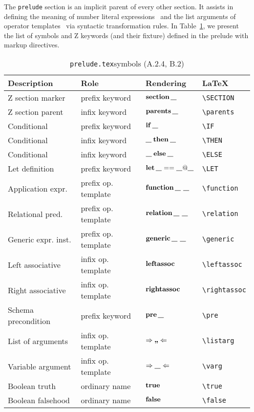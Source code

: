 \documentclass{article}
\newcommand{\emfile}[1]{\texttt{#1}}%
\newcommand{\preludefile}{\emfile{prelude.tex}}
\newcommand{\smallcaption}[1]{{\small (#1)}}
\begin{document}
The \texttt{prelude} section is an implicit parent of every other section.
It assists in defining the meaning of number literal expressions~\cite[12.2.6.9]{isoz}
and the list arguments of operator templates~\cite[12.2.12]{isoz} via syntactic transformation
rules. In Table~\ref{tbl:symbol-toolkit-prelude}, we present the list of symbols
and Z keywords (and their fixture) defined in the prelude with markup directives.
%
\begin{table}[ht]
\centering
\begin{tabular}{|l|l|l|l|}
   \hline
   \textbf{Description} & \textbf{Role} & \textbf{Rendering} & \textbf{\LaTeX} \\
   \hline
   Z section marker     & prefix keyword      & $\SECTION\varg$                 & \verb|\SECTION| \\
   \hline
   Z section parent     & infix keyword       & $\parents\varg$                 & \verb|\parents| \\
   \hline
   Conditional          & prefix keyword      & $\IF\varg$                      & \verb|\IF| \\
   \hline
   Conditional          & infix keyword       & $\varg\THEN\varg$               & \verb|\THEN| \\
   \hline
   Conditional          & infix keyword       & $\varg\ELSE\varg$               & \verb|\ELSE| \\
   \hline
   Let definition       & prefix keyword      & $\LET\varg==\varg @ \varg$      & \verb|\LET| \\
   \hline
   Application expr.    & prefix op. template & $\function\varg~\varg$          & \verb|\function| \\
   \hline
   Relational pred.     & prefix op. template & $\relation\varg~\varg$          & \verb|\relation| \\
   \hline
   Generic expr. inst.  & prefix op. template & $\generic\varg~\varg$           & \verb|\generic| \\
   \hline
   Left associative     & infix op. template  & $\leftassoc$                    & \verb|\leftassoc| \\
   \hline
   Right associative    & infix op. template  & $\rightassoc$                   & \verb|\rightassoc| \\
   \hline
   Schema precondition  & prefix keyword      & $\pre\varg$                     & \verb|\pre| \\
   \hline
   List of arguments    & infix op. template  & $\Rightarrow\listarg\Leftarrow$ & \verb|\listarg| \\
   \hline
   Variable argument    & infix op. template  & $\Rightarrow\varg\Leftarrow$    & \verb|\varg| \\
   \hline
   Boolean truth       & ordinary name   & $\true$                         & \verb|\true| \\
   \hline
   Boolean falsehood   & ordinary name   & $\false$                        & \verb|\false| \\
   \hline
\end{tabular}
\caption{\preludefile symbols \smallcaption{A.2.4, B.2}}\label{tbl:symbol-toolkit-prelude}
\end{table}
\end{document}
